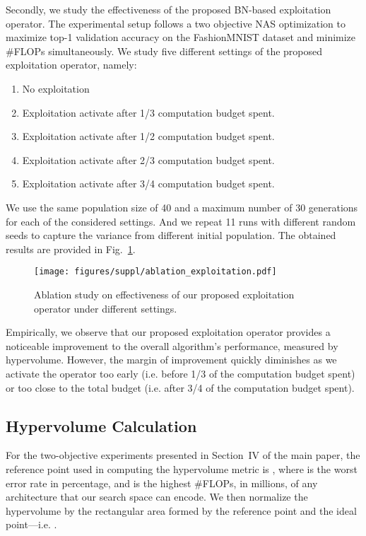 \documentclass[journal]{IEEEtran}
\theoremstyle{definition}
\theoremstyle{remark}
\begin{document}
{Secondly, we study the effectiveness of the proposed BN-based exploitation operator. The experimental setup follows a two objective NAS optimization to maximize top-1 validation accuracy on the FashionMNIST dataset \cite{xiao2017fashion} and minimize \#FLOPs simultaneously. We study five different settings of the proposed exploitation operator, namely:
\begin{enumerate}
    \item No exploitation
    \item Exploitation activate after 1/3 computation budget spent. 
    \item Exploitation activate after 1/2 computation budget spent. 
    \item Exploitation activate after 2/3 computation budget spent. 
    \item Exploitation activate after 3/4 computation budget spent.
\end{enumerate}
We use the same population size of 40 and a maximum number of 30 generations for each of the considered settings. And we repeat 11 runs with different random seeds to capture the variance from different initial population. The obtained results are provided in Fig.~\ref{fig:ablation_exploitation}.

\begin{figure}[hbt]
    \centering
    \texttt{[image: figures/suppl/ablation\_exploitation.pdf]}
    \caption{Ablation study on effectiveness of our proposed exploitation operator under different settings.\label{fig:ablation_exploitation}}
\end{figure}

Empirically, we observe that our proposed exploitation operator provides a noticeable improvement to the overall algorithm's performance, measured by hypervolume. However, the margin of improvement quickly diminishes as we activate the operator too early (i.e. before 1/3 of the computation budget spent) or too close to the total budget (i.e. after 3/4 of the computation budget spent). 
}

{
\subsection{Hypervolume Calculation\label{sec:supple_hypervolume}}
For the two-objective experiments presented in Section~IV of the main paper, the reference point used in computing the hypervolume metric is , where  is the worst error rate in percentage, and  is the highest \#FLOPs, in millions, of any architecture that our search space can encode. We then normalize the hypervolume by the rectangular area formed by the reference point and the ideal point---i.e. . 
}







%
 
\end{document}
